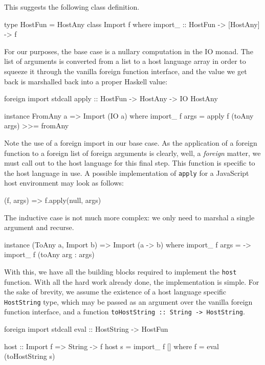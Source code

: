\documentclass[preprint]{sigplanconf}
\begin{document}
This suggests the following class definition.

\begin{code}
type HostFun = HostAny
class Import f where
  import_ :: HostFun -> [HostAny] -> f
\end{code}

For our purposes, the base case is a nullary computation in the IO monad.
The list of arguments is converted from a list to
a host language array in order to squeeze it through the vanilla foreign
function interface, and the value we get back is marshalled back into a proper
Haskell value:

\begin{code}
foreign import stdcall
  apply :: HostFun -> HostAny -> IO HostAny

instance FromAny a => Import (IO a) where
  import_ f args =
    apply f (toAny args) >>= fromAny
\end{code}

Note the use of a foreign import in our base case. As the application of a
foreign function to a foreign list of foreign arguments is clearly, well, a
\emph{foreign} matter, we must call out to the host language for this final
step.
This function is specific to the host language in use. A possible
implementation of \lstinline!apply! for a JavaScript host environment may look
as follows:

\begin{code}
(f, args) => f.apply(null, args)
\end{code}

The inductive case is not much more complex: we only need to marshal a single
argument and recurse.

\begin{code}
instance (ToAny a, Import b) =>
         Import (a -> b) where
  import_ f args =
    \arg -> import_ f (toAny arg : args)
\end{code}

With this, we have all the building blocks required to implement the
\lstinline!host! function. With all the hard work already done, the
implementation is simple. For the sake of brevity, we assume the
existence of a host language specific \lstinline!HostString! type, which may
be passed as an argument over the vanilla foreign function interface, and a
function \lstinline!toHostString :: String -> HostString!.

\begin{code}
foreign import stdcall
  eval :: HostString -> HostFun

host :: Import f => String -> f
host s = import_ f []
  where
    f = eval (toHostString s)
\end{code}
\end{document}

